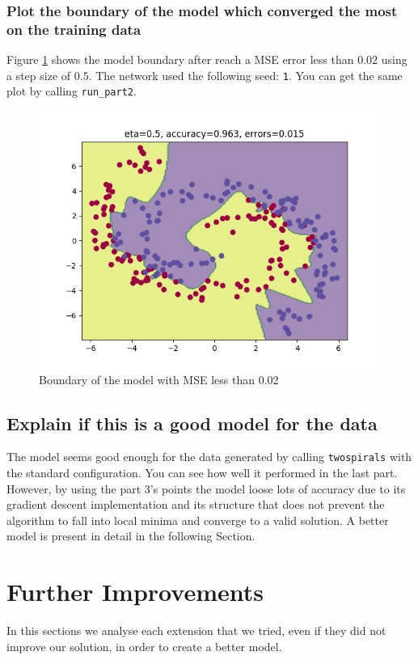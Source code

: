 \documentclass[11pt]{article}
\begin{document}
\subsubsection{Plot the boundary of the model which converged the most on the training data}
Figure \ref{fig: NN_MSE_002_boundary} shows the model boundary after reach a MSE error less than $0.02$ using a step size of $0.5$. The network used the following seed: \texttt{1}. You can get the same plot by calling \texttt{run\_part2}.
\begin{figure}[H]
\centering
\includegraphics[scale=0.6]{images/NN_boundary_vs_learning_rates/0}	
\caption{Boundary of the model with MSE less than 0.02}
\label{fig: NN_MSE_002_boundary}
\end{figure}
 \subsection{Explain if this is a good model for the data}
The model seems good enough for the data generated by calling \texttt{twospirals} with the standard configuration. You can see how well it performed in the last part. However, by using the part 3's points the model loose lots of accuracy due to its gradient descent implementation and its structure that does not prevent the algorithm to fall into local minima and converge to a valid solution. A better model is present in detail in the following Section.
\section{Further Improvements}
In this sections we analyse each extension that we tried, even if they did not improve our solution, in order to create a better model.
\end{document}
